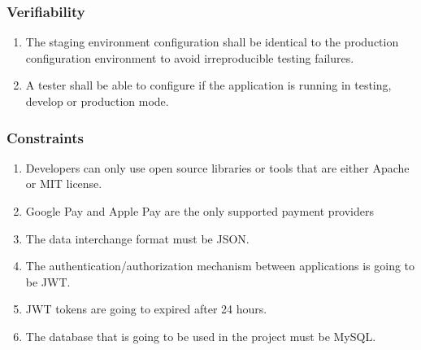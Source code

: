 \subsubsection{Verifiability}
\begin{enumerate}[label=VER-\arabic*]
    \item The staging environment configuration shall be identical to the 
    production configuration environment to avoid irreproducible 
    testing failures.
    \item A tester shall be able to configure if the application is 
    running in testing, develop or production mode.
\end{enumerate}
\subsubsection{Constraints}
\begin{enumerate}[label=CON-\arabic*]
    \item Developers can only use open source libraries or tools that are 
    either Apache or MIT license.
    \item Google Pay and Apple Pay are the only supported payment providers
    \item The data interchange format must be JSON.
    \item The authentication/authorization mechanism between applications 
    is going to be JWT.
    \item JWT tokens are going to expired after 24 hours.
    \item The database that is going to be used in the project must be MySQL.
\end{enumerate}